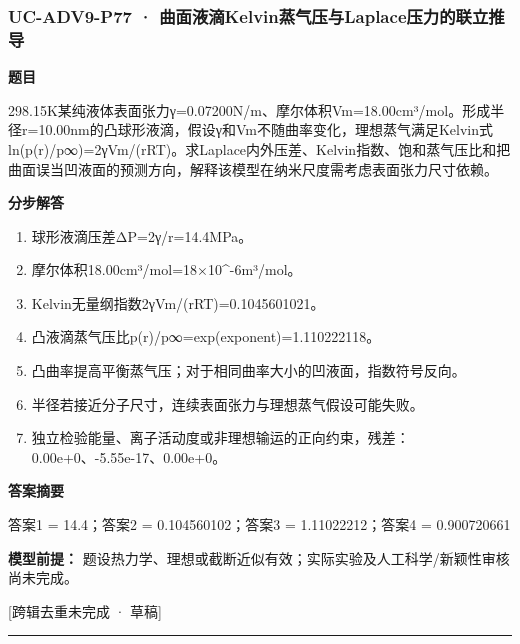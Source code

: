 \documentclass[UTF8,11pt,a4paper]{ctexart}
\begin{document}
\subsubsection*{UC-ADV9-P77 · 曲面液滴Kelvin蒸气压与Laplace压力的联立推导}
\noindent\textbf{题目}\par
298.15K某纯液体表面张力γ=0.07200N/m、摩尔体积Vm=18.00cm³/mol。形成半径r=10.00nm的凸球形液滴，假设γ和Vm不随曲率变化，理想蒸气满足Kelvin式ln(p(r)/p∞)=2γVm/(rRT)。求Laplace内外压差、Kelvin指数、饱和蒸气压比和把曲面误当凹液面的预测方向，解释该模型在纳米尺度需考虑表面张力尺寸依赖。\par
\medskip\noindent\textbf{分步解答}
\begin{enumerate}
\item 球形液滴压差ΔP=2γ/r=14.4MPa。
\item 摩尔体积18.00cm³/mol=18×10\textasciicircum{}-6m³/mol。
\item Kelvin无量纲指数2γVm/(rRT)=0.1045601021。
\item 凸液滴蒸气压比p(r)/p∞=exp(exponent)=1.110222118。
\item 凸曲率提高平衡蒸气压；对于相同曲率大小的凹液面，指数符号反向。
\item 半径若接近分子尺寸，连续表面张力与理想蒸气假设可能失败。
\item 独立检验能量、离子活动度或非理想输运的正向约束，残差：0.00e+0、-5.55e-17、0.00e+0。
\end{enumerate}
\noindent\textbf{答案摘要}\par
答案1 = 14.4；答案2 = 0.104560102；答案3 = 1.11022212；答案4 = 0.900720661\par
\noindent\textbf{模型前提：}
题设热力学、理想或截断近似有效；实际实验及人工科学/新颖性审核尚未完成。\par
\noindent\textcolor{red!65!black}{[跨辑去重未完成 · 草稿]} \par
\medskip\hrule\medskip
{}
\end{document}
